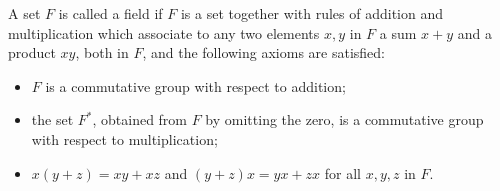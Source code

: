 A set $F$ is called a field if $F$ is a set together with rules of addition and multiplication which associate to any two elements $x, y$ in $F$ a sum $x+y$ and a product $xy$, both in $F$, and the following axioms are satisfied:

\begin{itemize}
\item[F.1.] $F$ is a commutative group with respect to addition;
\item[F.2.] the set $F^*$, obtained from $F$ by omitting the zero, is a commutative group with respect to multiplication;
\item[F.3.] $x(y+z) = xy+xz$ and $(y+z)x = yx+zx$ for all $x, y, z$ in $F$.
\end{itemize}
